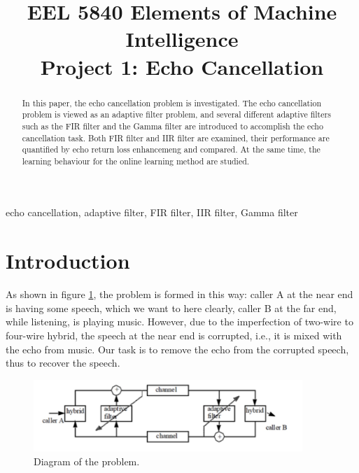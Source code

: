 \documentclass[conference]{IEEEtran}
\begin{document}
\title{EEL 5840 Elements of Machine Intelligence\\ Project 1: Echo Cancellation\\
}

\author{


}

\maketitle

\begin{abstract}
In this paper, the echo cancellation problem is investigated. The echo cancellation problem is viewed as an adaptive filter problem, and several different adaptive filters such as the FIR filter and the Gamma filter are introduced to accomplish the echo cancellation task. Both FIR filter and IIR filter are examined, their performance are quantified by echo return loss enhancemeng and compared. At the same time, the learning behaviour for the online learning method are studied.
\end{abstract}

\begin{IEEEkeywords}
echo cancellation, adaptive filter, FIR filter, IIR filter, Gamma filter
\end{IEEEkeywords}

\section{Introduction}

As shown in figure \ref{Diagram of the problem}, the problem is formed in this way: caller A at the near end is having some speech, which we want to here clearly, caller B at the far end, while listening, is playing music. However, due to the imperfection of two-wire to four-wire hybrid, the speech at the near end is corrupted, i.e., it is mixed with the echo from music. Our task is to remove the echo from the corrupted speech, thus to recover the speech.\\
\begin{figure}[htbp]
\centerline{\includegraphics[width=4in]{filter.jpeg}}
\caption{Diagram of the problem.}
\label{Diagram of the problem}
\end{figure}
\end{document}
